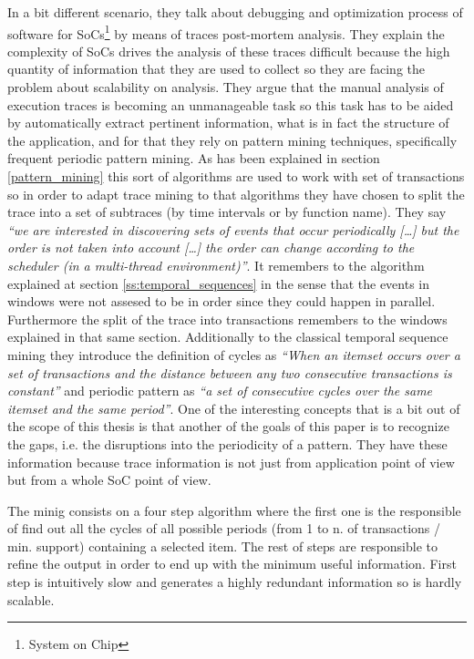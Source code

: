 In a bit different scenario, \cite{Lopez-Cueva2012} they talk about debugging 
and optimization process of
software for SoCs\footnote{System on Chip} by means of traces post-mortem
analysis. They explain the complexity of SoCs drives the analysis of these
traces difficult because the high quantity of information that they are used to
collect so they are facing the problem about scalability on analysis. They argue
that the manual analysis of execution traces is becoming an unmanageable task so
this task has to be aided by automatically extract pertinent information, what
is in fact the structure of the application, and for
that they rely on pattern mining techniques, specifically frequent periodic
pattern mining. As has been explained in section \ref{pattern_mining} this sort
of algorithms are used to work with set of transactions so in order to adapt
trace mining to that algorithms they have chosen to split the trace into a set
of subtraces (by time intervals or by function name). They say \textit{``we are
interested in discovering sets of events that occur periodically [\ldots] but
the order is not taken into account [\ldots] the order can change according to
the scheduler (in a multi-thread environment)''}. It remembers to the algorithm
explained at section \ref{ss:temporal_sequences} in the sense that the events in
windows were not assesed to be in order since they could happen in parallel.
Furthermore the split of the trace into transactions remembers to the windows
explained in that same section. Additionally to the classical temporal sequence
mining they introduce the definition of cycles as \textit{``When an itemset  occurs over 
a set of transactions and the distance between any two consecutive transactions 
is constant''} and periodic pattern as \textit{``a set of consecutive cycles over the
same itemset and the same period''}. One of the interesting concepts that is a
bit out of the scope of this thesis is that another of the goals of this paper
is to recognize the gaps, i.e. the disruptions into the periodicity of a
pattern. They have these information because trace information is not just from
application point of view but from a whole SoC point of view. 

The minig consists on a four step algorithm where the first one is the
responsible of find out all the cycles of all possible periods (from 1 to n. of
transactions / min. support) containing a selected item. The rest of steps are
responsible to refine the output in order to end up with the minimum useful
information. First step is intuitively slow and generates a highly redundant
information so is hardly scalable.


